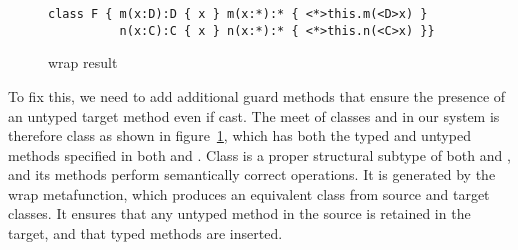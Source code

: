 \documentclass[sigconf]{acmart}
\begin{document}
\begin{figure}[h]
\begin{lstlisting}
class F { m(x:D):D { x } m(x:*):* { <*>this.m(<D>x) }
          n(x:C):C { x } n(x:*):* { <*>this.n(<C>x) }}
\end{lstlisting}
\caption{wrap result}
\label{fig:monwrap}
\end{figure}


To fix this, we need to add additional guard methods that ensure the
presence of an untyped target method even if cast. The meet of classes \C
and \D in our system is therefore class  as shown in
figure~\ref{fig:monwrap}, which has both the typed and untyped methods
specified in both \C and \D. Class  is a proper structural subtype of
both \C and \D, and its methods perform semantically correct operations. It
is generated by the wrap metafunction, which produces an equivalent class
from source and target classes. It ensures that any untyped method in the
source is retained in the target, and that typed methods are inserted.
\end{document}
